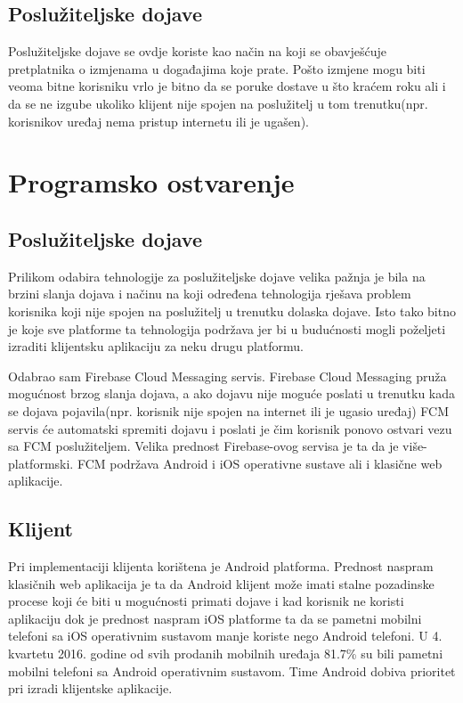 \documentclass[times, utf8, zavrsni]{fer}
\begin{document}
\section{Poslužiteljske dojave}
Poslužiteljske dojave se ovdje koriste kao način na koji se obavješćuje pretplatnika o izmjenama u događajima koje prate. Pošto izmjene mogu biti veoma bitne korisniku vrlo je bitno da se poruke dostave u što kraćem roku ali i da se ne izgube ukoliko klijent nije spojen na poslužitelj u tom trenutku(npr. korisnikov uređaj nema pristup internetu ili je ugašen).

\chapter{Programsko ostvarenje}

\section{Poslužiteljske dojave}
Prilikom odabira tehnologije za poslužiteljske dojave velika pažnja je bila na brzini slanja dojava i načinu na koji određena tehnologija rješava problem korisnika koji nije spojen na poslužitelj u trenutku dolaska dojave. Isto tako bitno je koje sve platforme ta tehnologija podržava jer bi u budućnosti mogli poželjeti izraditi klijentsku aplikaciju za neku drugu platformu.

Odabrao sam Firebase Cloud Messaging servis. Firebase Cloud Messaging pruža mogućnost brzog slanja dojava, a ako dojavu nije moguće poslati u trenutku kada se dojava pojavila(npr. korisnik nije spojen na internet ili je ugasio uređaj) FCM servis će automatski spremiti dojavu i poslati je čim korisnik ponovo ostvari vezu sa FCM poslužiteljem. Velika prednost Firebase-ovog servisa je ta da je više-platformski. FCM podržava Android i iOS operativne sustave ali i klasične web aplikacije.

\section{Klijent}
Pri implementaciji klijenta korištena je Android platforma. Prednost naspram klasičnih web aplikacija je ta da Android klijent može imati stalne pozadinske procese koji će biti u mogućnosti primati dojave i kad korisnik ne koristi aplikaciju dok je prednost naspram iOS platforme ta da se pametni mobilni telefoni sa iOS operativnim sustavom manje koriste nego Android telefoni. U 4. kvartetu 2016. godine od svih prodanih mobilnih uređaja 81.7\% \citep{vincent2017} su bili pametni mobilni telefoni sa Android operativnim sustavom. Time Android dobiva prioritet pri izradi klijentske aplikacije.
\end{document}
